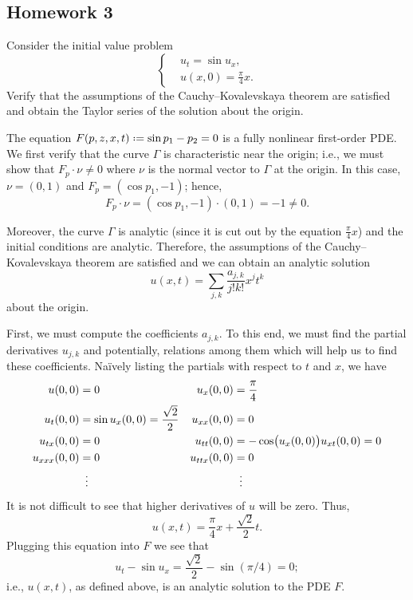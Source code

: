 \subsection{Homework 3}
\begin{problem}
  Consider the initial value problem
  \[
    \left\{
      \begin{aligned}
        &u_t=\sin u_x,\\
        &u(x,0)=\frac{\pi}{4}x.
      \end{aligned}
    \right.
  \]
  Verify that the assumptions of the Cauchy--Kovalevskaya theorem are
  satisfied and obtain the Taylor series of the solution about the origin.
\end{problem}
\begin{solution*}
  The equation \(F(p,z,x,t)\defeq\sin p_1-p_2=0\) is a fully nonlinear
  first-order PDE. We first verify that the curve \(\Gamma\) is
  characteristic near the origin; i.e., we must show that \(F_p\cdot\nu\neq
  0\) where \(\nu\) is the normal vector to \(\Gamma\) at the origin. In
  this case, \(\nu=(0,1)\) and \(F_p=(\cos p_1,-1)\); hence,
  \[
    F_p\cdot\nu= (\cos p_1,-1)\cdot(0,1)=-1\neq 0.
  \]

  Moreover, the curve \(\Gamma\) is analytic (since it is cut out by the
  equation \(\frac{\pi}{4}x\)) and the initial conditions are
  analytic. Therefore, the assumptions of the Cauchy--Kovalevskaya theorem
  are satisfied and we can obtain an analytic solution
  \[
    u(x,t)=\sum_{j,k}\frac{a_{j,k}}{j!k!}x^jt^k
  \]
  about the origin.

  First, we must compute the coefficients \(a_{j,k}\). To this end, we must
  find the partial derivatives \(u_{j,k}\) and potentially, relations among
  them which will help us to find these coefficients. Naïvely listing the
  partials with respect to \(t\) and \(x\), we have
  \begin{align*}
    u(0,0)&=0&
    u_x(0,0)&=\frac{\pi}{4}\\
    u_t(0,0)&=\sin u_x(0,0)=\frac{\sqrt{2}}{2}&
    u_{xx}(0,0)&=0\\
    u_{tx}(0,0)&=0&
    u_{tt}(0,0)&=-\cos\bigl(u_x(0,0)\bigr)u_{xt}(0,0)=0\\
    u_{xxx}(0,0)&=0&
    u_{ttx}(0,0)&=0\\
    &\vdotswithin{=}&&\vdotswithin{=}
  \end{align*}
  It is not difficult to see that higher derivatives of \(u\) will be
  zero. Thus,
  \[
    u(x,t)=\frac{\pi}{4}x+\frac{\sqrt{2}}{2}t.
  \]
  Plugging this equation into \(F\) we see that
  \[
    u_t-\sin u_x=\frac{\sqrt{2}}{2}-\sin(\pi/4)=0;
  \]
  i.e., \(u(x,t)\), as defined above, is an analytic solution to the PDE
  \(F\).
\end{solution*}

